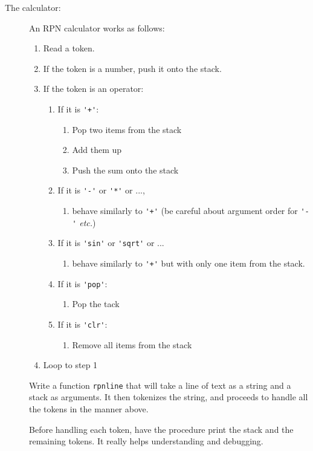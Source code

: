 \documentclass[12pt]{article}
\begin{document}
\begin{description}
\item[The calculator:]  An RPN calculator works as follows:
\begin{enumerate}
\item Read a token.  
\item If the token is a number, push it onto the stack.
\item If the token is an operator:
  \begin{enumerate}
  \item If it is \lstinline{'+'}:
    \begin{enumerate}
    \item Pop two items from the stack
    \item Add them up
    \item Push the sum onto the stack
    \end{enumerate}
  \item If it is \lstinline{'-'} or \lstinline{'*'} or ...,
    \begin{enumerate}
    \item behave similarly to \lstinline{'+'} (be careful about
    argument order for \lstinline{'-'} {\em etc.})
   \end{enumerate}
  \item If it is \lstinline{'sin'} or \lstinline{'sqrt'} or ...
    \begin{enumerate}
    \item behave similarly to \lstinline{'+'} but with only one item from the stack.
    \end{enumerate}
  \item If it is \lstinline{'pop'}:
    \begin{enumerate}
    \item Pop the tack
   \end{enumerate}
  \item If it is \lstinline{'clr'}:
    \begin{enumerate}
    \item Remove all items from the stack
   \end{enumerate}
  \end{enumerate}
\item Loop to step 1
\end{enumerate}

Write a function \lstinline{rpnline} that will take a line of
text as a string and a stack as arguments.
It then tokenizes the string,  and proceeds to handle
all the tokens in the manner above.

Before handling each token, have the procedure print
the stack and the remaining tokens.  It really helps understanding
and debugging.


\end{description}
\end{document}
